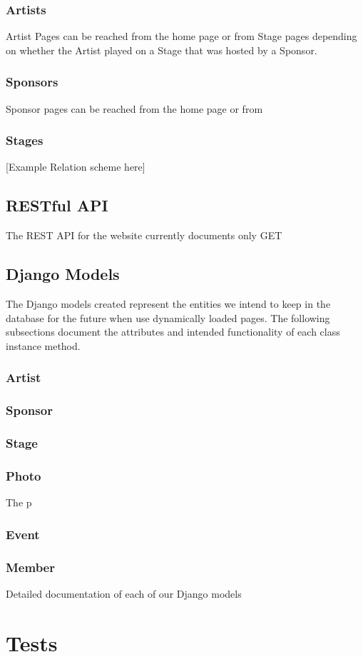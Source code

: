 \documentclass[12pt,english]{article}
\begin{document}
\subsubsection{Artists}
Artist Pages can be reached from the home page or from Stage pages depending on whether the Artist played on
a Stage that was hosted by a Sponsor. 
\subsubsection{Sponsors}
Sponsor pages can be reached from the home page or from 

\subsubsection{Stages}


[Example Relation scheme here]

\subsection{RESTful  API}
The REST API for the website currently documents only GET 

\subsection{Django Models}
The Django models created represent the entities we intend to keep in the database for the future when use dynamically loaded pages.
The following subsections document the attributes and intended functionality of each class instance method.
\subsubsection{Artist}

\subsubsection{Sponsor}

\subsubsection{Stage}

\subsubsection{Photo}
The p
\subsubsection{Event}

\subsubsection{Member}

Detailed documentation of each of our Django models
\section{Tests}
\end{document}
